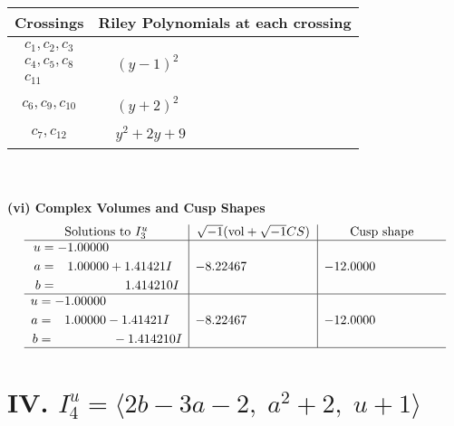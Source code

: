 \documentclass[1p]{elsarticle_modified}
\theoremstyle{definition}
\newcommand{\I}{\sqrt{-1}}
\begin{document}
\begin{tabular}{m{50pt}|m{274pt}}
Crossings & \hspace{64pt}Riley Polynomials at each crossing \\
\hline $$\begin{aligned}c_{1},c_{2},c_{3}\\c_{4},c_{5},c_{8}\\c_{11}\end{aligned}$$&$\begin{aligned}
&(y-1)^2
\end{aligned}$\\
\hline $$\begin{aligned}c_{6},c_{9},c_{10}\end{aligned}$$&$\begin{aligned}
&(y+2)^2
\end{aligned}$\\
\hline $$\begin{aligned}c_{7},c_{12}\end{aligned}$$&$\begin{aligned}
&y^2+2 y+9
\end{aligned}$\\
\hline
\end{tabular}\\~\\
\newpage\flushleft \textbf{(vi) Complex Volumes and Cusp Shapes}
$$\begin{array}{c|c|c}  
\text{Solutions to }I^u_{3}& \I (\text{vol} + \sqrt{-1}CS) & \text{Cusp shape}\\
 \hline 
\begin{aligned}
u &= -1.00000\phantom{ +0.000000I} \\
a &= \phantom{-}1.00000 + 1.41421 I \\
b &= \phantom{-0.000000 -}1.414210 I\end{aligned}
 & -8.22467\phantom{ +0.000000I} & -12.0000\phantom{ +0.000000I} \\ \hline\begin{aligned}
u &= -1.00000\phantom{ +0.000000I} \\
a &= \phantom{-}1.00000 - 1.41421 I \\
b &= \phantom{-0.000000 } -1.414210 I\end{aligned}
 & -8.22467\phantom{ +0.000000I} & -12.0000\phantom{ +0.000000I}\\
 \hline 
 \end{array}$$\newpage\newpage\renewcommand{\arraystretch}{1}
\centering \section*{IV. $I^u_{4}= \langle 2 b-3 a-2,\;a^2+2,\;u+1 \rangle$}
\end{document}

